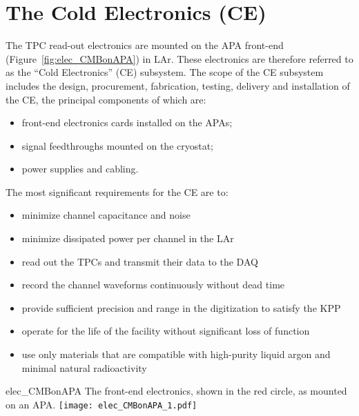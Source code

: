 \section{The Cold Electronics (CE)} 
\label{sec:detectors-fd-ref-ce}

The TPC read-out electronics are mounted on the APA front-end (Figure~\ref{fig:elec_CMBonAPA}) in LAr.
These electronics are therefore referred to as the ``Cold Electronics'' (CE) subsystem. 
The scope of the CE subsystem includes the design, procurement, fabrication, testing,
delivery and installation of the CE, the principal components of which are:
\begin{itemize}
\item front-end electronics cards installed on the APAs;
\item signal feedthroughs mounted on the cryostat;
\item power supplies and cabling.
\end{itemize}
The most significant requirements for the CE are to:
\begin{itemize}	
\item minimize channel capacitance and noise
\item minimize dissipated power per channel in the LAr
\item read out the TPCs and transmit their data to the DAQ
\item record the channel waveforms continuously without dead time
\item provide sufficient precision and range in the digitization to satisfy the KPP
\item operate for the life of the facility without significant loss of function
\item use only materials that are compatible with high-purity liquid argon and minimal natural radioactivity
\end{itemize}
\begin{cdrfigure}{elec_CMBonAPA}
 {The front-end electronics, shown in the red circle, as mounted on an APA.}
\texttt{[image: elec\_CMBonAPA\_1.pdf]}
\end{cdrfigure}

